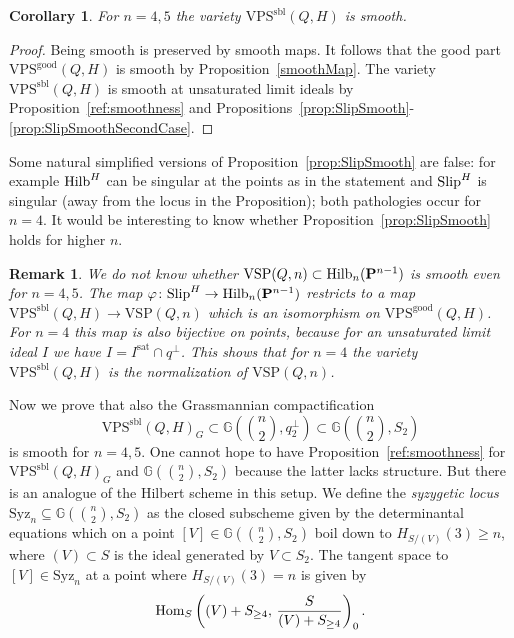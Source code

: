 \documentclass{amsart}
\newcommand{\Hilb}{{\rm{Hilb}}}
\newcommand{\Slip}{{\rm{Slip}}}
\newcommand{\Hom}{{\rm{Hom}}}
\newcommand{\PP}{{\bf P}}
\def\Gr #1#2{{\mathbb G}\left(#1,#2\right)} %
\newcommand{\Hvanilla}{\Hilb_{n}(\PP^{n-1})}
\newcommand{\VPSsbl}{{\mathrm{VPS}}^{\mathrm{sbl}}(Q, H)}
\newcommand{\VPSgood}{{\mathrm{VPS}}^{\mathrm{good}}(Q, H)}
\newcommand{\VSPn}{\mathrm{VSP}(Q, n)}
\newcommand{\Syz}{\mathrm{Syz}_n}%
\newcommand{\sat}{\mathrm{sat}}%
\newtheorem{corollary}[lemma]{\bf Corollary}
\newtheorem{remark}[lemma]{\bf Remark}
\begin{document}
\begin{corollary}\label{ref:VSPborderSmooth:cor}
    For $n=4,5$ the variety $\VPSsbl$ is smooth.
\end{corollary}
\begin{proof}
    Being smooth is preserved by smooth maps. It follows that the good part
    $\VPSgood$ is smooth by Proposition~\ref{smoothMap}. The variety
    $\VPSsbl$ is smooth at unsaturated limit ideals  by
    Proposition~\ref{ref:smoothness} and
    Propositions~\ref{prop:SlipSmooth}-\ref{prop:SlipSmoothSecondCase}.
\end{proof}
Some natural simplified versions of Proposition~\ref{prop:SlipSmooth} are
false: for example $\Hilb^H$ can be singular at the points as in
the statement and
$\Slip^H$ is singular (away from the locus in the Proposition); both pathologies occur for $n=4$.
It would be interesting to know whether Proposition~\ref{prop:SlipSmooth}
holds for higher $n$.

\begin{remark}\label{ref:VSPinHilb:remark}
   {\rm We do not know whether $\VSPn\subset \Hvanilla$ is smooth even for $n=4,5$. The map $\varphi\colon \Slip^H\to
    \Hvanilla$ restricts to a map $\VPSsbl\to \VSPn$ which is an isomorphism
    on $\VPSgood$. For $n=4$ this map is also bijective on points, because for an
    unsaturated
    limit ideal $I$ we have $I = I^{\sat} \cap q^\perp$. This shows
    that for $n=4$ the variety $\VPSsbl$ is the normalization of $\VSPn$.}
\end{remark}


\newcommand{\Syzfour}{\operatorname{Syz}_4}%
Now we prove that also the Grassmannian compactification
$$\VPSsbl_G\subset \Gr{\binom{n}{2}}{q^\perp_2}\subset \Gr{\binom{n}{2}}{S_2}$$ is smooth for $n=4,5$.
One cannot hope to have Proposition~\ref{ref:smoothness} for $\VPSsbl_G$ and
$\Gr{\binom{n}{2}}{S_2}$ because the latter lacks structure. But there is an
analogue of the Hilbert scheme in this setup. We define the \emph{syzygetic
locus} $\Syz\subseteq \Gr{\binom{n}{2}}{S_2}$ as the closed subscheme given by the
determinantal equations which on a point $[V]\in \Gr{\binom{n}{2}}{S_2}$ boil
down to $H_{S/(V)}(3) \geq n$, where $(V)\subset S$ is the ideal generated by $V\subset S_2$.
The tangent space to $[V]\in \Syz$ at a point where $H_{S/(V)}(3) = n$ is given by
\[
    \Hom_S\left((V) + S_{\geq 4},\, \frac{S}{(V)+S_{\geq 4}}\right)_0.
\]
\end{document}
